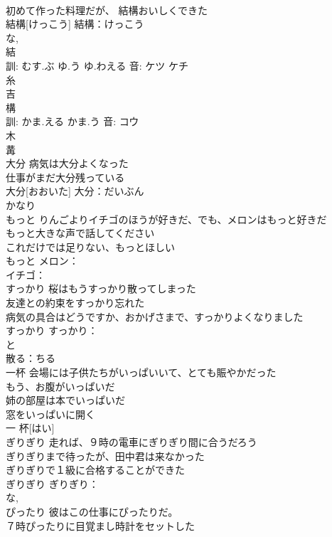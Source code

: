 \documentclass[8pt]{extreport}
\begin{document}
\begin{CJK}{UTF8}{min}
\\	初めて作った料理だが、 結構おいしくできた 
\\	結構[けっこう]			結構：けっこう
\\	な, 
\\	結 
\\	訓: むす.ぶ ゆ.う ゆ.わえる 音: ケツ ケチ 
\\	糸 
\\	吉 
\\	構 
\\	訓: かま.える かま.う 音: コウ 
\\	木 
\\	冓 
\\	大分	病気は大分よくなった 
\\	仕事がまだ大分残っている 
\\	大分[おおいた]			大分：だいぶん
\\	かなり 
\\	もっと	りんごよりイチゴのほうが好きだ、でも、メロンはもっと好きだ 
\\	もっと大きな声で話してください 
\\	これだけでは足りない、もっとほしい 
\\	もっと			メロン：
\\	イチゴ：
\\	すっかり	桜はもうすっかり散ってしまった 
\\	友達との約束をすっかり忘れた 
\\	病気の具合はどうですか、おかげさまで、すっかりよくなりました 
\\	すっかり			すっかり：
\\	と 
\\	散る：ちる
\\	一杯	会場には子供たちがいっぱいいて、とても賑やかだった 
\\	もう、お腹がいっぱいだ 
\\	姉の部屋は本でいっぱいだ 
\\	窓をいっぱいに開く 
\\	一 杯[はい]						
\\	ぎりぎり	走れば、９時の電車にぎりぎり間に合うだろう 
\\	ぎりぎりまで待ったが、田中君は来なかった 
\\	ぎりぎりで１級に合格することができた 
\\	ぎりぎり			ぎりぎり：
\\	な, 
\\	ぴったり	彼はこの仕事にぴったりだ。 
\\	７時ぴったりに目覚まし時計をセットした 

\end{CJK}
\end{document}

